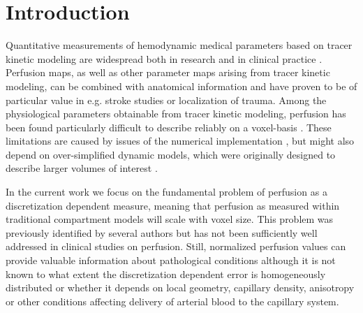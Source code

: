 \documentclass[final,5p,times,twocolumn]{elsarticle}
\begin{document}
\section{Introduction}
	Quantitative measurements of hemodynamic medical parameters based on tracer kinetic modeling are widespread both in research and in clinical practice \cite{sourbron13,Feng2013,Chen2011}. 
	Perfusion maps, as well as other parameter maps arising from tracer kinetic modeling, can be combined with anatomical information and have proven to be of particular value in e.g. stroke studies or localization of trauma.
	Among the physiological parameters obtainable from tracer kinetic modeling, perfusion has been found particularly difficult to describe reliably on a voxel-basis \cite{kudo10}.
	These limitations are caused by issues of the numerical implementation \cite{kudo10}, but might also depend on over-simplified dynamic models, which were originally designed to describe larger volumes of interest \cite{zierler00}.	
	
In the current work we focus on the fundamental problem of perfusion as a discretization dependent measure, meaning that perfusion as measured within traditional compartment models will scale with voxel size. This problem was previously identified by several authors \cite{Henkelman1990,Guibert2013,sourbron14} but has not been sufficiently well addressed in clinical studies on perfusion. Still, normalized perfusion values can provide valuable information about pathological conditions although it is not known to what extent the discretization dependent error is homogeneously distributed or whether it depends on local geometry, capillary density, anisotropy or other conditions affecting delivery of arterial blood to the capillary system. %
\end{document}
